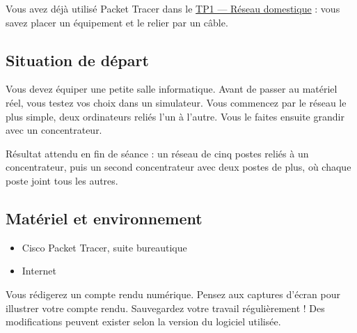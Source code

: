 \documentclass[
  french,
  10pt,
  a4paper,
]{scrartcl}
\providecommand{\tightlist}{%
  \setlength{\itemsep}{0pt}\setlength{\parskip}{0pt}}
\begin{document}
Vous avez déjà utilisé Packet Tracer dans le
\href{../tp-reseau-domestique/index.qmd}{TP1 --- Réseau domestique} :
vous savez placer un équipement et le relier par un câble.

\subsection{Situation de départ}\label{situation-de-duxe9part}

Vous devez équiper une petite salle informatique. Avant de passer au
matériel réel, vous testez vos choix dans un simulateur. Vous commencez
par le réseau le plus simple, deux ordinateurs reliés l'un à l'autre.
Vous le faites ensuite grandir avec un concentrateur.

Résultat attendu en fin de séance : un réseau de cinq postes reliés à un
concentrateur, puis un second concentrateur avec deux postes de plus, où
chaque poste joint tous les autres.

\subsection{Matériel et
environnement}\label{matuxe9riel-et-environnement}

\begin{tcolorbox}[enhanced jigsaw, arc=.35mm, bottomrule=.15mm, bottomtitle=1mm, breakable, colback=white, colbacktitle=quarto-callout-tip-color!10!white, colframe=quarto-callout-tip-color-frame, coltitle=black, left=2mm, leftrule=.75mm, opacityback=0, opacitybacktitle=0.6, rightrule=.15mm, title=\textcolor{quarto-callout-tip-color}{\faLightbulb}\hspace{0.5em}{Support d'activité}, titlerule=0mm, toprule=.15mm, toptitle=1mm]

\begin{itemize}
\tightlist
\item
  Cisco Packet Tracer, suite bureautique
\item
  Internet
\end{itemize}

\end{tcolorbox}

Vous rédigerez un compte rendu numérique. Pensez aux captures d'écran
pour illustrer votre compte rendu. Sauvegardez votre travail
régulièrement ! Des modifications peuvent exister selon la version du
logiciel utilisée.
\end{document}

